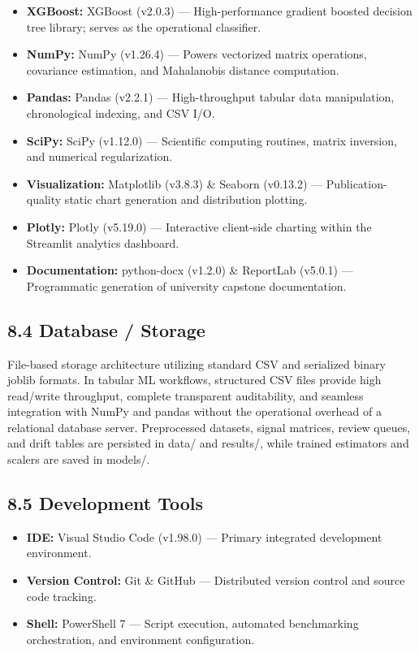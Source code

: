 \begin{itemize}
\item \textbf{XGBoost:} XGBoost (v2.0.3) --- High-performance gradient boosted decision tree library; serves as the operational classifier.
\item \textbf{NumPy:} NumPy (v1.26.4) --- Powers vectorized matrix operations, covariance estimation, and Mahalanobis distance computation.
\item \textbf{Pandas:} Pandas (v2.2.1) --- High-throughput tabular data manipulation, chronological indexing, and CSV I/O.
\item \textbf{SciPy:} SciPy (v1.12.0) --- Scientific computing routines, matrix inversion, and numerical regularization.
\item \textbf{Visualization:} Matplotlib (v3.8.3) \& Seaborn (v0.13.2) --- Publication-quality static chart generation and distribution plotting.
\item \textbf{Plotly:} Plotly (v5.19.0) --- Interactive client-side charting within the Streamlit analytics dashboard.
\item \textbf{Documentation:} python-docx (v1.2.0) \& ReportLab (v5.0.1) --- Programmatic generation of university capstone documentation.
\end{itemize}

\subsection{8.4 Database / Storage}

File-based storage architecture utilizing standard CSV and serialized binary joblib formats. In tabular ML workflows, structured CSV files provide high read/write throughput, complete transparent auditability, and seamless integration with NumPy and pandas without the operational overhead of a relational database server. Preprocessed datasets, signal matrices, review queues, and drift tables are persisted in data/ and results/, while trained estimators and scalers are saved in models/.

\subsection{8.5 Development Tools}

\begin{itemize}
\item \textbf{IDE:} Visual Studio Code (v1.98.0) --- Primary integrated development environment.
\item \textbf{Version Control:} Git \& GitHub --- Distributed version control and source code tracking.
\item \textbf{Shell:} PowerShell 7 --- Script execution, automated benchmarking orchestration, and environment configuration.
\end{itemize}

